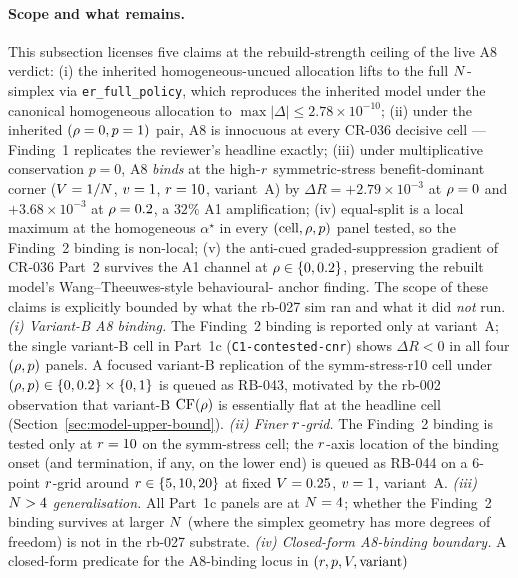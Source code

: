 \paragraph{Scope and what remains.}
This subsection licenses five claims at the rebuild-strength ceiling
of the live A8 verdict: (i) the inherited homogeneous-uncued allocation
lifts to the full $N$-simplex via \texttt{er\_full\_policy}, which
reproduces the inherited model under the canonical homogeneous
allocation to $\max|\Delta| \le 2.78\!\times\!10^{-10}$; (ii) under
the inherited $(\rho = 0, p = 1)$ pair, A8 is innocuous at every
CR-036 decisive cell — Finding~1 replicates the reviewer's headline
exactly; (iii) under multiplicative conservation $p = 0$, A8
\emph{binds} at the high-$r$ symmetric-stress benefit-dominant
corner ($V = 1/N$, $v = 1$, $r = 10$, variant~A) by
$\Delta R = +2.79\!\times\!10^{-3}$ at $\rho = 0$ and
$+3.68\!\times\!10^{-3}$ at $\rho = 0.2$, a $32\%$ A1 amplification;
(iv) equal-split is a local maximum at the homogeneous $\alpha^\star$
in every $(\text{cell}, \rho, p)$ panel tested, so the Finding~2
binding is non-local; (v) the anti-cued graded-suppression gradient
of CR-036 Part~2 survives the A1 channel at $\rho \in \{0, 0.2\}$,
preserving the rebuilt model's Wang--Theeuwes-style behavioural-
anchor finding. The scope of these claims is explicitly bounded by
what the rb-027 sim ran and what it did \emph{not} run.
\emph{(i) Variant-B A8 binding.} The Finding~2 binding is reported
only at variant~A; the single variant-B cell in Part~1c
(\texttt{C1-contested-cnr}) shows $\Delta R < 0$ in all four
$(\rho, p)$ panels. A focused variant-B replication of the
symm-stress-r10 cell under $(\rho, p) \in \{0, 0.2\} \times \{0, 1\}$
is queued as RB-043, motivated by the rb-002 observation that
variant-B $\mathrm{CF}(\rho)$ is essentially flat at the headline cell
(Section~\ref{sec:model-upper-bound}). \emph{(ii) Finer $r$-grid.}
The Finding~2 binding is tested only at $r = 10$ on the
symm-stress cell; the $r$-axis location of the binding onset
(and termination, if any, on the lower end) is queued as RB-044
on a $6$-point $r$-grid around $r \in \{5, 10, 20\}$ at
fixed $V = 0.25$, $v = 1$, variant~A. \emph{(iii) $N > 4$
generalisation.} All Part~1c panels are at $N = 4$; whether the
Finding~2 binding survives at larger $N$ (where the simplex
geometry has more degrees of freedom) is not in the rb-027 substrate.
\emph{(iv) Closed-form A8-binding boundary.} A closed-form predicate
for the A8-binding locus in $(r, p, V, \text{variant})$
